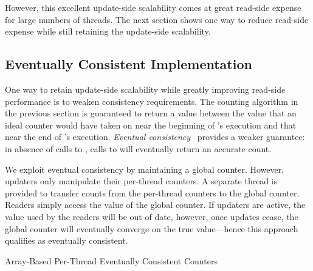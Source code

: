 However, this excellent update-side scalability comes at great read-side
expense for large numbers of threads.
The next section shows one way to reduce read-side expense while
still retaining the update-side scalability.

\subsection{Eventually Consistent Implementation}
\label{sec:count:Eventually Consistent Implementation}

One way to retain update-side scalability while greatly improving
read-side performance is to weaken consistency requirements.
The counting algorithm in the previous section is guaranteed to
return a value between the value that an ideal counter would have
taken on near the beginning of 's execution and
that near the end of 's execution.
\emph{Eventual consistency}~\cite{WernerVogels:2009:EventuallyConsistent}
provides a weaker
guarantee: in absence of calls to , calls to
 will eventually return an accurate count.

We exploit eventual consistency by maintaining a global counter.
However, updaters only manipulate their per-thread counters.
A separate thread is provided to transfer counts from the per-thread
counters to the global counter.
Readers simply access the value of the global counter.
If updaters are active, the value used by the readers will be out of
date, however, once updates cease, the global counter will eventually
converge on the true value---hence this approach qualifies as
eventually consistent.

\begin{listing}[tbp]

\caption{Array-Based Per-Thread Eventually Consistent Counters}
\label{lst:count:Array-Based Per-Thread Eventually Consistent Counters}
\end{listing}

